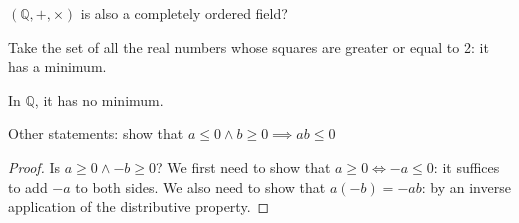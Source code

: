 \documentclass[12pt,a4paper]{report}
\numberwithin{equation}{section}
\theoremstyle{definition}
\theoremstyle{remark}
\begin{document}
$(\mathbb{Q}, +, \times) $ is also a completely ordered field?

Take the set of all the real numbers whose squares are greater or equal to 2: it has a minimum.

In $\mathbb{Q}$, it has no minimum.

Other statements: show that $a \leq 0 \wedge b \geq 0 \implies ab \leq 0$

\begin{proof}
Is $a \geq 0 \wedge -b \geq 0$? We first need to show that $a \geq 0 \iff -a \leq 0$: it suffices to add $-a$ to both sides. We also need to show that $a (-b) = -ab$: by an inverse application of the distributive property.
\end{proof}

\tableofcontents
\end{document}
